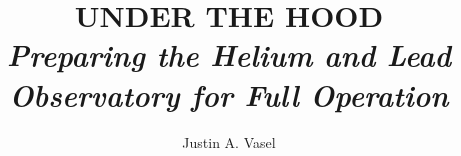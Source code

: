 %
%
%
%


\ms %

\title{\fontsize{45}{60}\selectfont\medio UNDER THE HOOD \normalfont \normalsize  \\ \vspace{0.1in} \large \light \emph{Preparing the Helium and Lead Observatory for Full Operation} \normalfont \normalsize}
\author{Justin A. Vasel}


\abstract{}
\copyrightpage %
\acknowledgements{}
\dedication{}
\abbreviations{}


\beforepreface 

\figurespage
\tablespage

\afterpreface            


